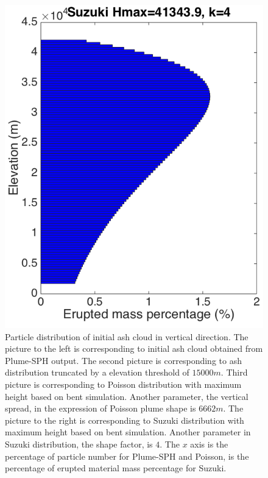 \begin{figure}[!htb]
\begin{minipage}{.247 \textwidth}
    \end{minipage}%
    \begin{minipage}{.247 \textwidth}
        \centering
        \includegraphics[width=0.99 \textwidth]{Chapter-7/Figures/Suzuki-Hmax40k-ParticleDis-z}
    \end{minipage}%
    \caption{Particle distribution of initial ash cloud in vertical direction. The picture to the left is corresponding to initial ash cloud obtained from Plume-SPH output. The second picture is corresponding to ash distribution truncated by a elevation threshold of $15000 m$. Third picture is corresponding to Poisson distribution with maximum height based on bent simulation. Another parameter, the vertical spread, in the expression of Poisson plume shape is $6662 m$. The picture to the right is corresponding to Suzuki distribution with maximum height based on bent simulation. Another parameter in Suzuki distribution, the shape factor, is $4$. The $x$ axis is the percentage of particle number for Plume-SPH and Poisson, is the percentage of erupted material mass percentage for Suzuki.}
    \label{fig:Particle-distribution-Plume-SPH-vs-semiempirical}
\end{figure}

